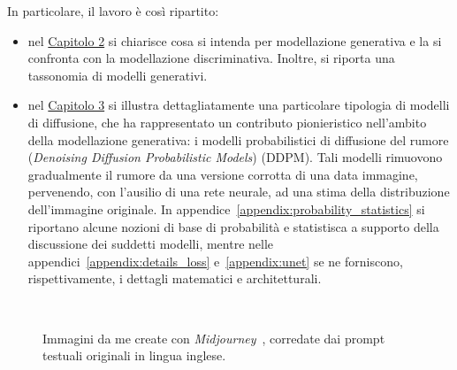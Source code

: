 \noindent In particolare, il lavoro è così ripartito:
\begin{itemize}
\item nel \hyperref[chap:generative_modeling]{Capitolo 2} si chiarisce cosa si intenda per modellazione generativa e la si confronta con la modellazione discriminativa. Inoltre, si riporta una tassonomia di modelli generativi.
\item nel \hyperref[chap:diff_models]{Capitolo 3} si illustra dettagliatamente una particolare tipologia di modelli di diffusione, che ha rappresentato un contributo pionieristico nell'ambito della modellazione generativa:
i modelli probabilistici di diffusione del rumore (\emph{Denoising Diffusion Probabilistic Models}) (DDPM). Tali modelli rimuovono gradualmente il rumore 
da una versione corrotta di una data immagine, pervenendo, con l'ausilio di una rete neurale, ad una stima della distribuzione dell'immagine originale.
In appendice~\ref{appendix:probability_statistics} si riportano alcune nozioni di base di probabilità e statistisca a supporto della discussione dei suddetti modelli, 
mentre nelle appendici~\ref{appendix:details_loss} e~\ref{appendix:unet} se ne forniscono, rispettivamente, i dettagli matematici e architetturali.
\end{itemize}
 


\begin{figure}
    \centering
     \quad
     \\
     \quad
    \caption{Immagini da me create con \emph{Midjourney}~\cite{Midjourney}, corredate dai prompt testuali originali in lingua inglese.}
    \label{fig:midjourney_figures}
\end{figure}
